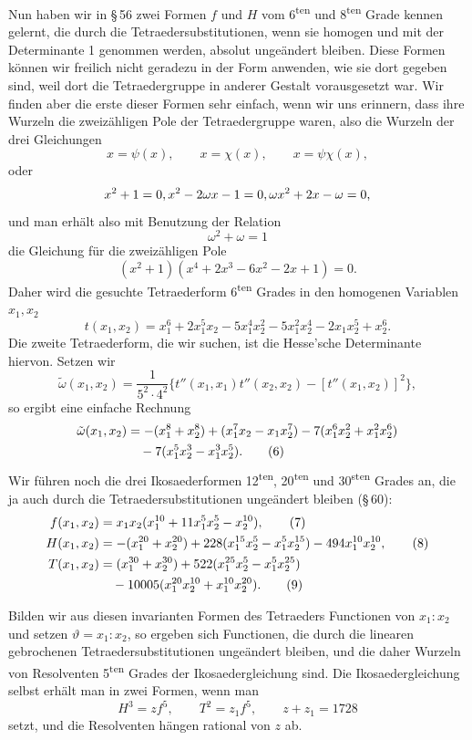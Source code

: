 \documentclass[11pt]{article}
\begin{document}
Nun haben wir in \S\,56 zwei Formen \(f\) und \(H\) vom 6\textsuperscript{ten} und 8\textsuperscript{ten} Grade kennen gelernt, die durch die Tetraedersubstitutionen, wenn sie homogen und mit der Determinante 1 genommen werden, absolut ungeändert bleiben. Diese Formen können wir freilich nicht geradezu in der Form anwenden, wie sie dort gegeben sind, weil dort die Tetraedergruppe in anderer Gestalt vorausgesetzt war. Wir finden aber die erste dieser Formen sehr einfach, wenn wir uns erinnern, dass ihre Wurzeln die zweizähligen Pole der Tetraedergruppe waren, also die Wurzeln der drei Gleichungen
\[
x=\psi(x),\qquad x=\chi(x),\qquad x=\psi\chi(x),
\]
oder
\[
x^2+1=0,\\ x^2-2\omega x-1=0,\\ \omega x^2+2x-\omega=0,
\]
und man erhält also mit Benutzung der Relation
\[
\omega^2+\omega=1
\]
die Gleichung für die zweizähligen Pole
\[
(x^2+1)(x^4+2x^3-6x^2-2x+1)=0.
\]
Daher wird die gesuchte Tetraederform 6\textsuperscript{ten} Grades in den homogenen Variablen \(x_1,x_2\)
\begin{equation}
t(x_1,x_2)=x_1^6+2x_1^5x_2-5x_1^4x_2^2-5x_1^2x_2^4-2x_1x_2^5+x_2^6.
\tag{5}
\end{equation}
Die zweite Tetraederform, die wir suchen, ist die Hesse'sche Determinante hiervon. Setzen wir
\[
\tilde\omega(x_1,x_2)=\frac{1}{5^2\cdot4^2}\{t''(x_1,x_1)t''(x_2,x_2)-[t''(x_1,x_2)]^2\},
\]
so ergibt eine einfache Rechnung
\begin{align}
\tilde\omega(x_1,x_2)&=-(x_1^8+x_2^8)+(x_1^7x_2-x_1x_2^7)-7(x_1^6x_2^2+x_1^2x_2^6)\notag\\
&\quad -7(x_1^5x_2^3-x_1^3x_2^5).
\tag{6}
\end{align}
Wir führen noch die drei Ikosaederformen 12\textsuperscript{ten}, 20\textsuperscript{ten} und 30\textsuperscript{sten} Grades an, die ja auch durch die Tetraedersubstitutionen ungeändert bleiben (\S\,60):
\begin{align}
f(x_1,x_2)&=x_1x_2(x_1^{10}+11x_1^5x_2^5-x_2^{10}),\tag{7}\\
H(x_1,x_2)&=-(x_1^{20}+x_2^{20})+228(x_1^{15}x_2^5-x_1^5x_2^{15})-494x_1^{10}x_2^{10},\tag{8}\\
T(x_1,x_2)&=(x_1^{30}+x_2^{30})+522(x_1^{25}x_2^5-x_1^5x_2^{25})\notag\\
&\quad-10005(x_1^{20}x_2^{10}+x_1^{10}x_2^{20}).\tag{9}
\end{align}

Bilden wir aus diesen invarianten Formen des Tetraeders Functionen von \(x_1:x_2\) und setzen \(\vartheta=x_1:x_2\), so ergeben sich Functionen, die durch die linearen gebrochenen Tetraedersubstitutionen ungeändert bleiben, und die daher Wurzeln von Resolventen 5\textsuperscript{ten} Grades der Ikosaedergleichung sind. Die Ikosaedergleichung selbst erhält man in zwei Formen, wenn man
\begin{equation}
H^3=zf^5,
\qquad
T^2=z_1f^5,
\qquad
z+z_1=1728
\tag{10}
\end{equation}
setzt, und die Resolventen hängen rational von \(z\) ab.
\end{document}
